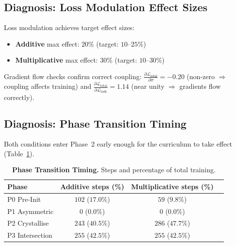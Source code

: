 \documentclass[10pt]{article}
\begin{document}
\subsection{Diagnosis: Loss Modulation Effect Sizes}

Loss modulation achieves target effect sizes:
\begin{itemize}[nosep]
\item \textbf{Additive} max effect: $20\%$ (target: $10$--$25\%$)
\item \textbf{Multiplicative} max effect: $30\%$ (target: $10$--$30\%$)
\end{itemize}
Gradient flow checks confirm correct coupling:
$\frac{\partial \mathcal{L}_{\text{total}}}{\partial \sigma} = -0.20$
(non-zero $\Rightarrow$ coupling affects training) and
$\frac{\partial \mathcal{L}_{\text{total}}}{\partial \mathcal{L}_{\text{task}}} = 1.14$
(near unity $\Rightarrow$ gradients flow correctly).

\subsection{Diagnosis: Phase Transition Timing}

Both conditions enter Phase~2 early enough for the curriculum to
take effect (Table~\ref{tab:phase-timing}).

\begin{table}[htbp]
\centering
\caption{\textbf{Phase Transition Timing.} Steps and percentage of
total training.\protect\footnotemark}
\label{tab:phase-timing}
\begin{tabular}{l c c c}
\toprule
\textbf{Phase} & \textbf{Additive steps (\%)} & \textbf{Multiplicative steps (\%)} \\
\midrule
P0 Pre-Init & $102$ ($17.0\%$) & $59$ ($9.8\%$) \\
P1 Asymmetric & $0$ ($0.0\%$) & $0$ ($0.0\%$) \\
P2 Crystallise & $243$ ($40.5\%$) & $286$ ($47.7\%$) \\
P3 Intersection & $255$ ($42.5\%$) & $255$ ($42.5\%$) \\
\bottomrule
\end{tabular}
\end{table}
\end{document}
